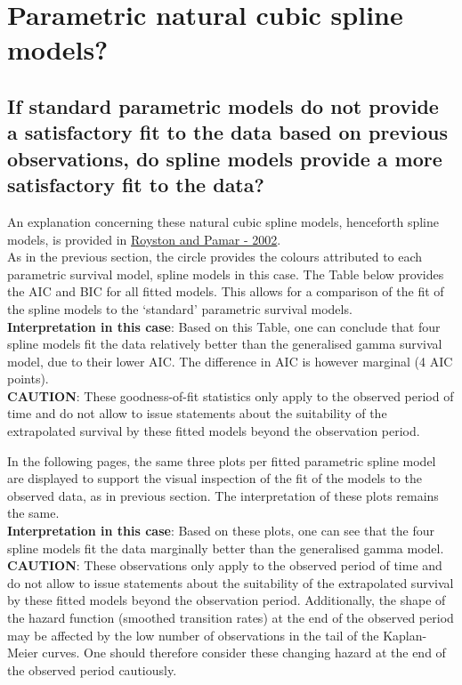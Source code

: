 \documentclass[]{article}
\begin{document}
\newpage

\section{Parametric natural cubic spline
models?}\label{parametric-natural-cubic-spline-models}

\subsection{If standard parametric models do not provide a satisfactory
fit to the data based on previous observations, do spline models provide
a more satisfactory fit to the
data?}\label{if-standard-parametric-models-do-not-provide-a-satisfactory-fit-to-the-data-based-on-previous-observations-do-spline-models-provide-a-more-satisfactory-fit-to-the-data}

An explanation concerning these natural cubic spline models, henceforth
spline models, is provided in
\href{https://doi.org/10.1002/sim.1203}{Royston and Pamar - 2002}.\\
As in the previous section, the circle provides the colours attributed
to each parametric survival model, spline models in this case. The Table
below provides the AIC and BIC for all fitted models. This allows for a
comparison of the fit of the spline models to the `standard' parametric
survival models.\\
\textbf{Interpretation in this case}: Based on this Table, one can
conclude that four spline models fit the data relatively better than the
generalised gamma survival model, due to their lower AIC. The difference
in AIC is however marginal (4 AIC points).\\
\textbf{CAUTION}: These goodness-of-fit statistics only apply to the
observed period of time and do not allow to issue statements about the
suitability of the extrapolated survival by these fitted models beyond
the observation period.

In the following pages, the same three plots per fitted parametric
spline model are displayed to support the visual inspection of the fit
of the models to the observed data, as in previous section. The
interpretation of these plots remains the same.\\
\textbf{Interpretation in this case}: Based on these plots, one can see
that the four spline models fit the data marginally better than the
generalised gamma model.\\
\textbf{CAUTION}: These observations only apply to the observed period
of time and do not allow to issue statements about the suitability of
the extrapolated survival by these fitted models beyond the observation
period. Additionally, the shape of the hazard function (smoothed
transition rates) at the end of the observed period may be affected by
the low number of observations in the tail of the Kaplan-Meier curves.
One should therefore consider these changing hazard at the end of the
observed period cautiously.
\end{document}
